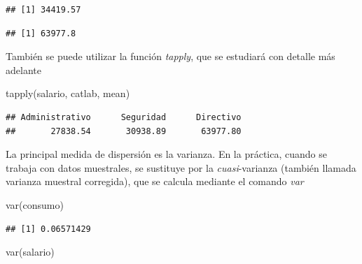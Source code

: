 \documentclass[
]{book}
\newenvironment{Shaded}{\begin{snugshade}}{\end{snugshade}}
\newcommand{\FunctionTok}[1]{\textcolor[rgb]{0.00,0.00,0.00}{#1}}
\newcommand{\NormalTok}[1]{#1}
\newcommand{\SpecialCharTok}[1]{\textcolor[rgb]{0.00,0.00,0.00}{#1}}
\newcommand{\StringTok}[1]{\textcolor[rgb]{0.31,0.60,0.02}{#1}}
\theoremstyle{break}
\begin{document}
\begin{verbatim}
## [1] 34419.57
\end{verbatim}

\begin{Shaded}
\end{Shaded}

\begin{verbatim}
## [1] 63977.8
\end{verbatim}

También se puede utilizar la función \emph{tapply}, que se estudiará
con detalle más adelante

\begin{Shaded}
\begin{Highlighting}[]
\FunctionTok{tapply}\NormalTok{(salario, catlab, mean)}
\end{Highlighting}
\end{Shaded}

\begin{verbatim}
## Administrativo      Seguridad      Directivo 
##       27838.54       30938.89       63977.80
\end{verbatim}

La principal medida de dispersión es la varianza. En la práctica, cuando
se trabaja con datos muestrales, se sustituye por la \emph{cuasi}-varianza
(también llamada varianza muestral corregida), que se calcula mediante
el comando \emph{var}

\begin{Shaded}
\begin{Highlighting}[]
\FunctionTok{var}\NormalTok{(consumo)}
\end{Highlighting}
\end{Shaded}

\begin{verbatim}
## [1] 0.06571429
\end{verbatim}

\begin{Shaded}
\begin{Highlighting}[]
\FunctionTok{var}\NormalTok{(salario)}
\end{Highlighting}
\end{Shaded}
\end{document}
